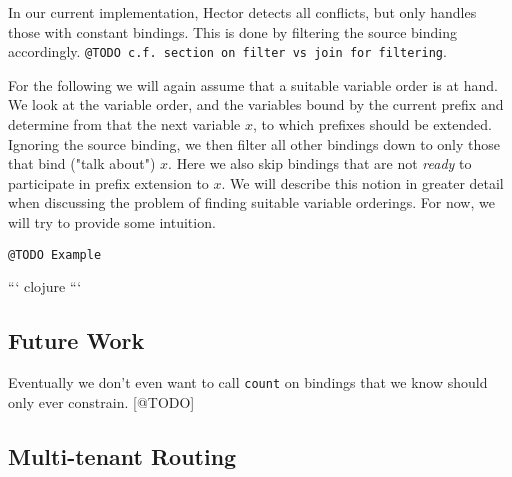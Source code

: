 \documentclass[../index.tex]{subfiles}
\begin{document}
In our current implementation, Hector detects all conflicts, but only
handles those with constant bindings. This is done by filtering the
source binding accordingly. \texttt{@TODO c.f. section on filter vs join for
filtering}.

For the following we will again assume that a suitable variable order
is at hand. We look at the variable order, and the variables bound by
the current prefix and determine from that the next variable $x$, to
which prefixes should be extended. Ignoring the source binding, we
then filter all other bindings down to only those that bind ("talk
about") $x$. Here we also skip bindings that are not \emph{ready} to
participate in prefix extension to $x$. We will describe this notion
in greater detail when discussing the problem of finding suitable
variable orderings. For now, we will try to provide some intuition.

\texttt{@TODO Example}

``` clojure
```

\subsection{Future Work}

Eventually we don't even want to call \texttt{count} on bindings that
we know should only ever constrain. [@TODO]

\subsection{Multi-tenant Routing}
\end{document}
